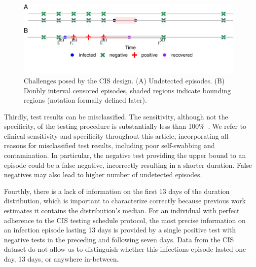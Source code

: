 \documentclass[referee,useAMS,usenatbib]{biom}
\begin{document}
\begin{figure}
  \includegraphics{figures/output/challenges}
  \caption{%
    Challenges posed by the CIS design.
    (A) Undetected episodes.
    (B) Doubly interval censored episodes, shaded regions indicate bounding regions (notation formally defined later).
  }
  \label{fig:challenges}
\end{figure}


Thirdly, test results can be misclassified.
The sensitivity, although not the specificity, of the testing procedure is substantially less than 100\%~\citep{cisMethodsONS}.
We refer to clinical sensitivity and specificity throughout this article, incorporating all reasons for misclassified test results, including poor self-swabbing and contamination.
In particular, the negative test providing the upper bound to an episode could be a false negative, incorrectly resulting in a shorter duration.
False negatives may also lead to higher number of undetected episodes.

Fourthly, there is a lack of information on the first 13 days of the duration distribution, which is important to characterize correctly because previous work estimates it contains the distribution's median.
For an individual with perfect adherence to the CIS testing schedule protocol, the most precise information on an infection episode lasting 13 days is provided by a single positive test with negative tests in the preceding and following seven days.
Data from the CIS dataset do not allow us to distinguish whether this infections episode lasted one day, 13 days, or anywhere in-between.


\end{document}
